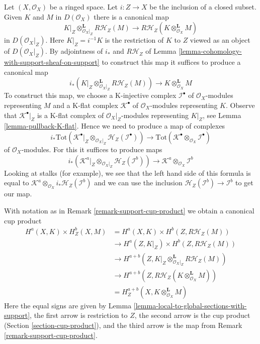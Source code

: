 \begin{remark}
\label{remark-support-cup-product}
Let $(X, \mathcal{O}_X)$ be a ringed space. Let $i : Z \to X$
be the inclusion of a closed subset. Given $K$ and $M$ in
$D(\mathcal{O}_X)$ there is a canonical map
$$
K|_Z \otimes_{\mathcal{O}_X|_Z}^\mathbf{L} R\mathcal{H}_Z(M)
\longrightarrow
R\mathcal{H}_Z(K \otimes_{\mathcal{O}_X}^\mathbf{L} M)
$$
in $D(\mathcal{O}_X|_Z)$. Here $K|_Z = i^{-1}K$ is the restriction of
$K$ to $Z$ viewed as an object of $D(\mathcal{O}_X|_Z)$. By adjointness
of $i_*$ and $R\mathcal{H}_Z$ of
Lemma \ref{lemma-cohomology-with-support-sheaf-on-support} to construct this
map it suffices to produce a canonical map
$$
i_*\left(K|_Z \otimes_{\mathcal{O}_X|_Z}^\mathbf{L} R\mathcal{H}_Z(M)\right)
\longrightarrow
K \otimes_{\mathcal{O}_X}^\mathbf{L} M
$$
To construct this map, we choose a K-injective complex $\mathcal{I}^\bullet$
of $\mathcal{O}_X$-modules representing $M$ and a K-flat complex
$\mathcal{K}^\bullet$ of $\mathcal{O}_X$-modules representing $K$.
Observe that $\mathcal{K}^\bullet|_Z$ is a K-flat complex of
$\mathcal{O}_X|_Z$-modules representing $K|_Z$, see
Lemma \ref{lemma-pullback-K-flat}. Hence we need to produce a map
of complexes
$$
i_*\text{Tot}\left(
\mathcal{K}^\bullet|_Z \otimes_{\mathcal{O}_X|_Z}
\mathcal{H}_Z(\mathcal{I}^\bullet)\right)
\longrightarrow
\text{Tot}(\mathcal{K}^\bullet \otimes_{\mathcal{O}_X} \mathcal{I}^\bullet)
$$
of $\mathcal{O}_X$-modules. For this it suffices to produce maps
$$
i_*(\mathcal{K}^a|_Z \otimes_{\mathcal{O}_X|_Z}
\mathcal{H}_Z(\mathcal{I}^b))
\longrightarrow
\mathcal{K}^a \otimes_{\mathcal{O}_X} \mathcal{I}^b
$$
Looking at stalks (for example), we see that the left hand side of this
formula is equal to
$\mathcal{K}^a \otimes_{\mathcal{O}_X} i_*\mathcal{H}_Z(\mathcal{I}^b)$
and we can use the inclusion
$\mathcal{H}_Z(\mathcal{I}^b) \to \mathcal{I}^b$ to get our map.
\end{remark}

\begin{remark}
\label{remark-support-cup-product-global}
With notation as in Remark \ref{remark-support-cup-product}
we obtain a canonical cup product
\begin{align*}
H^a(X, K) \times H^b_Z(X, M)
& =
H^a(X, K) \times H^b(Z, R\mathcal{H}_Z(M)) \\
& \to
H^a(Z, K|_Z) \times H^b(Z, R\mathcal{H}_Z(M)) \\
& \to
H^{a + b}(Z, K|_Z \otimes_{\mathcal{O}_X|_Z}^\mathbf{L} R\mathcal{H}_Z(M)) \\
& \to
H^{a + b}(Z, R\mathcal{H}_Z(K \otimes_{\mathcal{O}_X}^\mathbf{L} M)) \\
& =
H^{a + b}_Z(X, K \otimes_{\mathcal{O}_X}^\mathbf{L} M)
\end{align*}
Here the equal signs are given by
Lemma \ref{lemma-local-to-global-sections-with-support},
the first arrow is restriction to $Z$, the second
arrow is the cup product (Section \ref{section-cup-product}),
and the third arrow is the map from Remark \ref{remark-support-cup-product}.
\end{remark}

